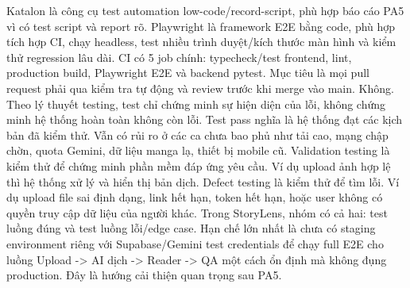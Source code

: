 {}Katalon là công cụ test automation low-code/record-script, phù hợp báo cáo PA5 vì có test script và report rõ.\markdownRendererParagraphSeparator
{}Playwright là framework E2E bằng code, phù hợp tích hợp CI, chạy headless, test nhiều trình duyệt/kích thước màn hình và kiểm thử regression lâu dài.\markdownRendererInterblockSeparator
{}
\markdownRendererSectionEnd \markdownRendererSectionBegin
{}\markdownRendererInterblockSeparator
{}CI có 5 job chính: typecheck/test frontend, lint, production build, Playwright E2E và backend pytest.\markdownRendererParagraphSeparator
{}Mục tiêu là mọi pull request phải qua kiểm tra tự động và review trước khi merge vào main.\markdownRendererInterblockSeparator
{}
\markdownRendererSectionEnd \markdownRendererSectionBegin
{}\markdownRendererInterblockSeparator
{}Không. Theo lý thuyết testing, test chỉ chứng minh sự hiện diện của lỗi, không chứng minh hệ thống hoàn toàn không còn lỗi.\markdownRendererParagraphSeparator
{}Test pass nghĩa là hệ thống đạt các kịch bản đã kiểm thử. Vẫn có rủi ro ở các ca chưa bao phủ như tải cao, mạng chập chờn, quota Gemini, dữ liệu manga lạ, thiết bị mobile cũ.\markdownRendererInterblockSeparator
{}
\markdownRendererSectionEnd \markdownRendererSectionBegin
{}\markdownRendererInterblockSeparator
{}Validation testing là kiểm thử để chứng minh phần mềm đáp ứng yêu cầu. Ví dụ upload ảnh hợp lệ thì hệ thống xử lý và hiển thị bản dịch.\markdownRendererParagraphSeparator
{}Defect testing là kiểm thử để tìm lỗi. Ví dụ upload file sai định dạng, link hết hạn, token hết hạn, hoặc user không có quyền truy cập dữ liệu của người khác.\markdownRendererParagraphSeparator
{}Trong StoryLens, nhóm có cả hai: test luồng đúng và test luồng lỗi/edge case.\markdownRendererInterblockSeparator
{}
\markdownRendererSectionEnd \markdownRendererSectionBegin
{}\markdownRendererInterblockSeparator
{}Hạn chế lớn nhất là chưa có staging environment riêng với Supabase/Gemini test credentials để chạy full E2E cho luồng Upload -> AI dịch -> Reader -> Q\markdownRendererAmpersand{}A một cách ổn định mà không đụng production.\markdownRendererParagraphSeparator
{}Đây là hướng cải thiện quan trọng sau PA5.\markdownRendererInterblockSeparator
{}\markdownRendererThematicBreak{}\markdownRendererInterblockSeparator
